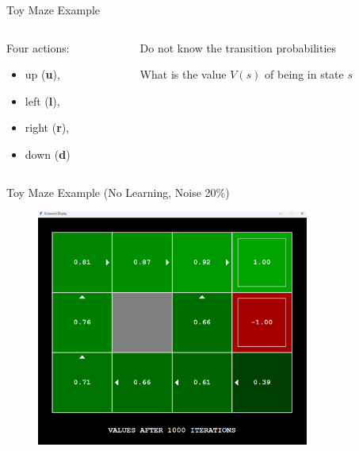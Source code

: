 \documentclass[11pt,table]{beamer}
\begin{document}
\begin{frame}{Toy Maze Example}
\vspace{6mm}
\centering
\begin{columns}
\begin{column}{0.4\textwidth}

Four actions:
\begin{itemize}
	\item up (\textbf{u}),
	\item left (\textbf{l}),
	\item right (\textbf{r}),
	\item down (\textbf{d})
\end{itemize}
\end{column}
\begin{column}{0.6\textwidth}
Do not know the transition probabilities

\vspace{3mm}
  \textcolor{red1}{What is the value $V(s)$ of being in state $s$}
\end{column}
\end{columns}
    
\end{frame}


\begin{frame}{Toy Maze Example (No Learning, Noise 20\%)}
\begin{figure}
	\centering
		\includegraphics[width=0.80\textwidth]{figures/gridworld_values.png}
	\label{fig:gridworld_values}
\end{figure}

\end{frame}
\end{document}
